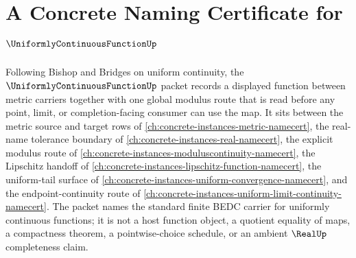\chapter{A Concrete Naming Certificate for $\UniformlyContinuousFunctionUp$}
\label{ch:concrete-instances-uniformly-continuous-function-namecert}

Following Bishop and Bridges on uniform continuity, the $\UniformlyContinuousFunctionUp$ packet records a displayed function between metric carriers together with one global modulus route that is read before any point, limit, or completion-facing consumer can use the map. It sits between the metric source and target rows of \autoref{ch:concrete-instances-metric-namecert}, the real-name tolerance boundary of \autoref{ch:concrete-instances-real-namecert}, the explicit modulus route of \autoref{ch:concrete-instances-moduluscontinuity-namecert}, the Lipschitz handoff of \autoref{ch:concrete-instances-lipschitz-function-namecert}, the uniform-tail surface of \autoref{ch:concrete-instances-uniform-convergence-namecert}, and the endpoint-continuity route of \autoref{ch:concrete-instances-uniform-limit-continuity-namecert}. The packet names the standard finite BEDC carrier for uniformly continuous functions; it is not a host function object, a quotient equality of maps, a compactness theorem, a pointwise-choice schedule, or an ambient $\RealUp$ completeness claim.


